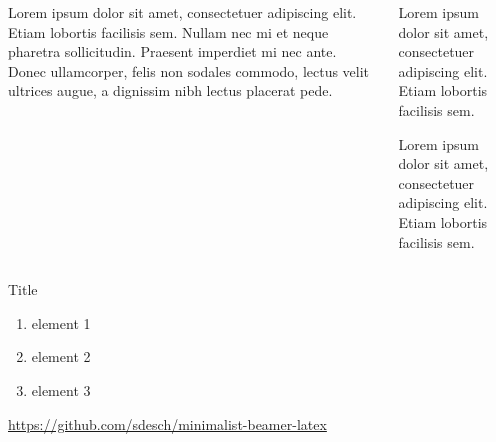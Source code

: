 \begin{frame}[plain]
    \begin{columns}
        \begin{column}{5cm}
            \begin{bbox}[]
                Lorem ipsum dolor sit amet, consectetuer adipiscing elit.
                Etiam lobortis facilisis sem. Nullam nec mi et neque
                pharetra sollicitudin. Praesent imperdiet mi nec ante. Donec
                ullamcorper, felis non sodales commodo, lectus velit ultrices
                augue, a dignissim nibh lectus placerat pede.
            \end{bbox}
        \end{column}
        \begin{column}{5cm}
            \begin{bbox}[note 1]
                Lorem ipsum dolor sit amet, consectetuer adipiscing elit.
                Etiam lobortis facilisis sem.
            \end{bbox}
            \begin{bbox}[note 2]
                Lorem ipsum dolor sit amet, consectetuer adipiscing elit.
                Etiam lobortis facilisis sem.
            \end{bbox}
        \end{column}
    \end{columns}
\end{frame}

\begin{frame}{Title}
    \begin{bbox}[list]
        \begin{enumerate}[$\bullet$]
            \item element 1
            \item element 2
            \item element 3
        \end{enumerate}
    \end{bbox}
    \centering
    \url{https://github.com/sdesch/minimalist-beamer-latex}
\end{frame}